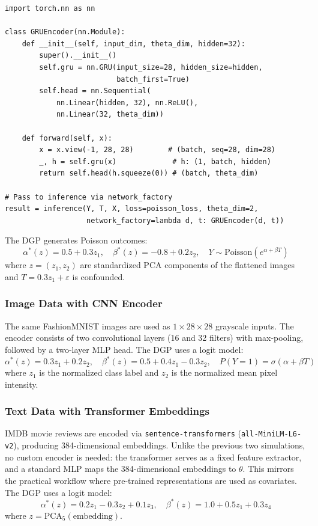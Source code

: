 \begin{lstlisting}
import torch.nn as nn

class GRUEncoder(nn.Module):
    def __init__(self, input_dim, theta_dim, hidden=32):
        super().__init__()
        self.gru = nn.GRU(input_size=28, hidden_size=hidden,
                          batch_first=True)
        self.head = nn.Sequential(
            nn.Linear(hidden, 32), nn.ReLU(),
            nn.Linear(32, theta_dim))

    def forward(self, x):
        x = x.view(-1, 28, 28)        # (batch, seq=28, dim=28)
        _, h = self.gru(x)             # h: (1, batch, hidden)
        return self.head(h.squeeze(0)) # (batch, theta_dim)

# Pass to inference via network_factory
result = inference(Y, T, X, loss=poisson_loss, theta_dim=2,
                   network_factory=lambda d, t: GRUEncoder(d, t))
\end{lstlisting}

\noindent The DGP generates Poisson outcomes:
\begin{equation}
    \alpha^*(z) = 0.5 + 0.3 z_1, \quad \beta^*(z) = -0.8 + 0.2 z_2, \quad Y \sim \text{Poisson}\!\left(e^{\alpha + \beta T}\right)
\end{equation}
where $z = (z_1, z_2)$ are standardized PCA components of the flattened images and $T = 0.3 z_1 + \varepsilon$ is confounded.

\subsubsection{Image Data with CNN Encoder}

The same FashionMNIST images are used as $1 \times 28 \times 28$ grayscale inputs. The encoder consists of two convolutional layers (16 and 32 filters) with max-pooling, followed by a two-layer MLP head. The DGP uses a logit model:
\begin{equation}
    \alpha^*(z) = 0.3 z_1 + 0.2 z_2, \quad \beta^*(z) = 0.5 + 0.4 z_1 - 0.3 z_2, \quad P(Y=1) = \sigma(\alpha + \beta T)
\end{equation}
where $z_1$ is the normalized class label and $z_2$ is the normalized mean pixel intensity.

\subsubsection{Text Data with Transformer Embeddings}

IMDB movie reviews are encoded via \texttt{sentence-transformers} (\texttt{all-MiniLM-L6-v2}), producing 384-dimensional embeddings. Unlike the previous two simulations, no custom encoder is needed: the transformer serves as a fixed feature extractor, and a standard MLP maps the 384-dimensional embeddings to $\theta$. This mirrors the practical workflow where pre-trained representations are used as covariates. The DGP uses a logit model:
\begin{equation}
    \alpha^*(z) = 0.2 z_1 - 0.3 z_2 + 0.1 z_3, \quad \beta^*(z) = 1.0 + 0.5 z_1 + 0.3 z_4
\end{equation}
where $z = \text{PCA}_5(\text{embedding})$.

